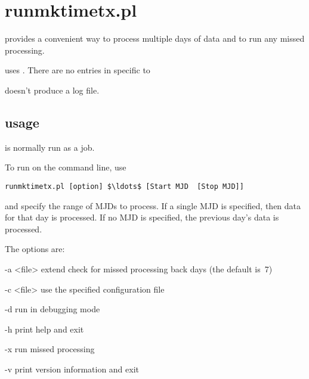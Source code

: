 
\section{runmktimetx.pl \label{runmktimetx}}

\hypertarget{h:runmktimetx}{}

 provides a convenient way to process multiple days of data and to run any missed processing.

 uses . There are no entries in  specific to 

 doesn't produce a log file.
	
\subsection{usage}
 is normally run as a  job.

To run  on the command line, use
\begin{lstlisting}[mathescape=true]
runmktimetx.pl [option] $\ldots$ [Start MJD  [Stop MJD]]
\end{lstlisting}

 and  specify the range of MJDs to process.
If a single MJD is specified, then data for that day is processed. If no
MJD is specified, the previous day's data is processed.

The options are:
\begin{description*}
	\item[-a \textless{file}\textgreater]  extend check for missed processing back  days 
		(the default is~7)
	\item[-c \textless{file}\textgreater] use the specified configuration file
	\item[-d]	run in debugging mode
	\item[-h]	print help and exit
	\item[-x] run missed processing
	\item[-v]	print version information and exit
\end{description*}
